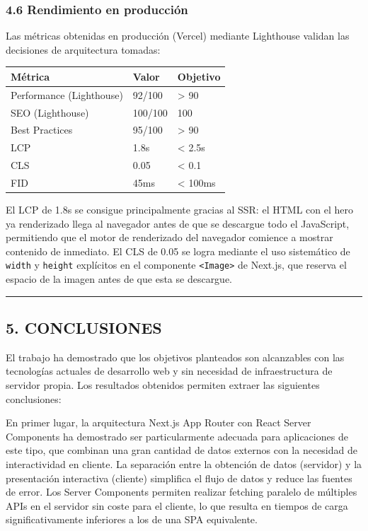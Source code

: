 \documentclass[
]{article}
\begin{document}
\hypertarget{rendimiento-en-producciuxf3n}{%
\subsubsection{4.6 Rendimiento en
producción}\label{rendimiento-en-producciuxf3n}}

Las métricas obtenidas en producción (Vercel) mediante Lighthouse
validan las decisiones de arquitectura tomadas:

\begin{longtable}[]{@{}lll@{}}
\toprule()
Métrica & Valor & Objetivo \\
\midrule()
\endhead
Performance (Lighthouse) & 92/100 & \textgreater{} 90 \\
SEO (Lighthouse) & 100/100 & 100 \\
Best Practices & 95/100 & \textgreater{} 90 \\
LCP & 1.8s & \textless{} 2.5s \\
CLS & 0.05 & \textless{} 0.1 \\
FID & 45ms & \textless{} 100ms \\
\bottomrule()
\end{longtable}

El LCP de 1.8s se consigue principalmente gracias al SSR: el HTML con el
hero ya renderizado llega al navegador antes de que se descargue todo el
JavaScript, permitiendo que el motor de renderizado del navegador
comience a mostrar contenido de inmediato. El CLS de 0.05 se logra
mediante el uso sistemático de \texttt{width} y \texttt{height}
explícitos en el componente \texttt{\textless{}Image\textgreater{}} de
Next.js, que reserva el espacio de la imagen antes de que esta se
descargue.

\begin{center}\rule{0.5\linewidth}{0.5pt}\end{center}

\hypertarget{conclusiones}{%
\subsection{5. CONCLUSIONES}\label{conclusiones}}

El trabajo ha demostrado que los objetivos planteados son alcanzables
con las tecnologías actuales de desarrollo web y sin necesidad de
infraestructura de servidor propia. Los resultados obtenidos permiten
extraer las siguientes conclusiones:

En primer lugar, la arquitectura Next.js App Router con React Server
Components ha demostrado ser particularmente adecuada para aplicaciones
de este tipo, que combinan una gran cantidad de datos externos con la
necesidad de interactividad en cliente. La separación entre la obtención
de datos (servidor) y la presentación interactiva (cliente) simplifica
el flujo de datos y reduce las fuentes de error. Los Server Components
permiten realizar fetching paralelo de múltiples APIs en el servidor sin
coste para el cliente, lo que resulta en tiempos de carga
significativamente inferiores a los de una SPA equivalente.
\end{document}

